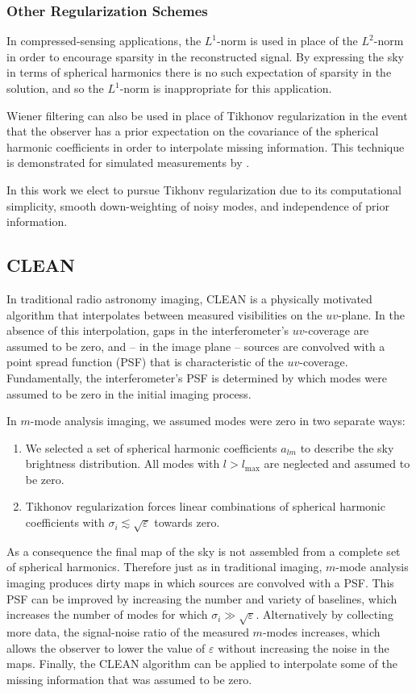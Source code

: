 \documentclass[twocolumn]{aastex61}
\begin{document}
\subsubsection{Other Regularization Schemes}

In compressed-sensing applications, the $L^1$-norm is used in place of the $L^2$-norm in order to
encourage sparsity in the reconstructed signal. By expressing the sky in terms of spherical
harmonics there is no such expectation of sparsity in the solution, and so the $L^1$-norm is
inappropriate for this application.

Wiener filtering can also be used in place of Tikhonov regularization in the event that the observer
has a prior expectation on the covariance of the spherical harmonic coefficients in order to
interpolate missing information. This technique is demonstrated for simulated measurements by
\citet{2016arXiv161203255B}.

In this work we elect to pursue Tikhonv regularization due to its computational simplicity, smooth
down-weighting of noisy modes, and independence of prior information.

\subsection{CLEAN}\label{sec:clean}

In traditional radio astronomy imaging, CLEAN \citep{1974A&AS...15..417H} is a physically motivated
algorithm that interpolates between measured visibilities on the $uv$-plane. In the absence of this
interpolation, gaps in the interferometer's $uv$-coverage are assumed to be zero, and -- in the
image plane -- sources are convolved with a point spread function (PSF) that is characteristic of
the $uv$-coverage.  Fundamentally, the interferometer's PSF is determined by which modes were
assumed to be zero in the initial imaging process.

In $m$-mode analysis imaging, we assumed modes were zero in two separate ways:
\begin{enumerate}
    \item We selected a set of spherical harmonic coefficients $a_{lm}$ to describe the sky
        brightness distribution. All modes with $l>l_\text{max}$ are neglected and assumed to be
        zero.
    \item Tikhonov regularization forces linear combinations of spherical harmonic coefficients with
        $\sigma_i \lesssim \sqrt{\varepsilon}$ towards zero.
\end{enumerate}
As a consequence the final map of the sky is not assembled from a complete set of spherical
harmonics. Therefore just as in traditional imaging, $m$-mode analysis imaging produces dirty maps
in which sources are convolved with a PSF.  This PSF can be improved by increasing the number and
variety of baselines, which increases the number of modes for which $\sigma_i \gg
\sqrt{\varepsilon}$.  Alternatively by collecting more data, the signal-noise ratio of the measured
$m$-modes increases, which allows the observer to lower the value of $\varepsilon$ without
increasing the noise in the maps.  Finally, the CLEAN algorithm can be applied to interpolate some
of the missing information that was assumed to be zero.
\end{document}
